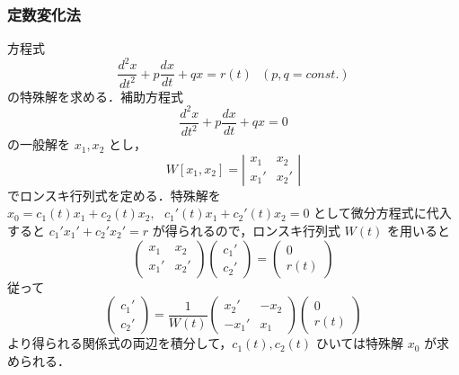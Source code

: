 \documentclass[dvipdfmx, a4paper]{jsarticle}
\begin{document}
\subsubsection{定数変化法}

方程式
\begin{equation}
    \frac{d^2x}{dt^2}+p\frac{dx}{dt}+qx=r(t)\ \ \ (p, q=const.)
\end{equation}
の特殊解を求める．補助方程式
\begin{equation}
    \frac{d^2x}{dt^2}+p\frac{dx}{dt}+qx=0
\end{equation}
の一般解を $x_1, x_2$ とし，
\begin{equation}
    W[x_1, x_2]=
    \left|\begin{matrix}
        x_1&x_2\\
        x_1'&x_2'
    \end{matrix}\right|
\end{equation}
でロンスキ行列式を定める．特殊解を $x_0=c_1(t)x_1+c_2(t)x_2,\ \ \ c_1'(t)x_1+c_2'(t)x_2=0$ として微分方程式に代入すると $c_1'x_1'+c_2'x_2'=r$ が得られるので，ロンスキ行列式 $W(t)$ を用いると
\begin{equation}
    \left(\begin{matrix}
        x_1&x_2\\
        x_1'&x_2'
    \end{matrix}\right)\left(
        \begin{matrix}
            c_1'\\
            c_2'
        \end{matrix}
    \right)
    =\left(\begin{matrix}
        0\\
        r(t)
    \end{matrix}\right)
\end{equation}
従って
\begin{equation}
    \left(
        \begin{matrix}
            c_1'\\
            c_2'
        \end{matrix}
    \right)
    =\frac{1}{W(t)}\left(\begin{matrix}
        x_2'&-x_2\\
        -x_1'&x_1
    \end{matrix}\right)\left(\begin{matrix}
        0\\
        r(t)
    \end{matrix}\right)
\end{equation}
より得られる関係式の両辺を積分して，$c_1(t), c_2(t)$ ひいては特殊解 $x_0$ が求められる．
\end{document}
